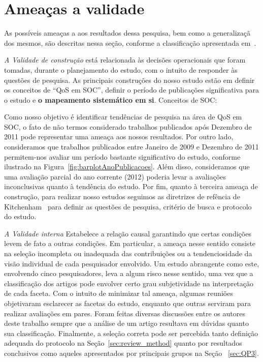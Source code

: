 \section{Amea\c cas a validade}

As poss\'{i}veis amea\c{c}as a aos resultados dessa pesquisa, bem como a generaliza\c c\~{a} dos mesmos, s\~{a}o descritas nessa se\c c\~{a}o, conforme a classifica\c c\~{a}o apresentada em~\cite{leedy1980practical}. 

\noindent
\emph{A Validade de constru\c c\~{a}o} est\'{a} relacionada
\`{a}s decis\~{o}es operacionais que foram tomadas, durante o
planejamento do estudo, com o intuito de responder \`{a}s quest\~{o}es de
pesquisa. As principais constru\c{c}\~{o}es do nosso estudo est\~{a}o em definir os conceitos de ``QoS em SOC'', definir o per\'{i}odo de publica\c{c}\~{o}es significativa para o estudo e \textbf{o mapeamento sistemático em si}. Conceitos de SOC:


Como nosso objetivo \'{e} identificar tend\^{e}ncias de pesquisa na \'{a}rea de QoS em SOC, o fato de n\~{a}o termos considerado trabalhos publicados ap\'{o}s Dezembro de 2011 pode representar uma amea\c ca aos nossos resultados. Por outro lado, consideramos que trabalhos publicados entre Janeiro de 2009 e Dezembro de 2011 permitem-nos avaliar um per\'{i}odo bastante significativo do estudo, conforme ilustrado na Figura~\ref{fig:barplotAnoPublicacoes}. Al\'{e}m disso, consideramos que uma avalia\c c\~{a}o parcial do ano corrente (2012) poderia levar a avalia\c{c}\~{o}es inconclusivas quanto \`{a} tend\^{e}ncia do estudo. Por fim, quanto \`{a} terceira amea\c{c}a de constru\c{c}\~{a}o, para realizar nosso estudos seguimos as diretrizes de ref\^{e}ncia de Kitchenham~\cite{kitchenham:techReport2007} para definir as quest\~{o}es de pesquisa, crit\'{e}rio de busca e protocolo do estudo.

\noindent
\emph{A Validade interna}
Estabelece a rela\c{c}\~{a}o causal garantindo que certas condi\c{c}\~{o}es levem de fato a outras condi\c{c}\~{o}es. Em particular, a ameaça nesse sentido consiste na seleção incompleta ou inadequada das contribuições ou a tendenciosidade da visão individual de cada pesquisador envolvido. Um estudo abrangente como este, envolvendo cinco pesquisadores, leva a algum risco nesse sentido, uma vez que a classifica\c c\~{a}o dos artigos pode envolver certo grau subjetividade na interpreta\c{c}\~{a}o de cada faceta. Com o intuito de minimizar tal amea\c{c}a, algumas reuni\~{o}es objetivaram esclarecer as facetas do estudo, enquanto que outras serviram para realizar avalia\c c\~{o}es em pares. Foram feitas diversas discuss\~{o}es entre os autores deste trabalho sempre que a an\'{a}lise de um artigo resultava em d\'{u}vidas quanto sua classifica\c c\~{a}o. Finalmente, a seleção correta pode ser percebida tanto definição adequada do protocolo na Seção~\ref{sec:review_method} quanto por resultados conclusivos como aqueles apresentados por principais grupos na Se\c{c}\~{a}o ~\ref{sec:QP3}.


